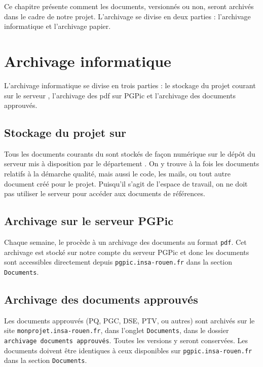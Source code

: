 
Ce chapitre présente comment les documents, versionnés ou non, seront archivés dans le cadre de notre projet. L’archivage se divise en deux parties : l’archivage informatique et l’archivage papier.

\section{Archivage informatique}
L'archivage informatique se divise en trois parties : le stockage du projet courant sur le serveur \git{}, l'archivage des pdf sur PGPic et l'archivage des documents approuvés.

\subsection{Stockage du projet sur \git{}}
Tous les documents courants du \PICCourt sont stockés de façon numérique sur le dépôt du serveur \git{} mis à disposition par le département \ASI{}. On y trouve à la fois les documents relatifs à la démarche qualité, mais aussi le code, les mails, ou tout autre document créé pour le projet. Puisqu'il s'agit de l'espace de travail, on ne doit pas utiliser le serveur \git{} pour accéder aux documents de références.

\subsection{Archivage sur le serveur PGPic}

Chaque semaine, le \RQ{} procède à un archivage des documents au format \verb+pdf+. Cet archivage est stocké sur notre compte du serveur PGPic et donc les documents sont accessibles directement depuis \verb+pgpic.insa-rouen.fr+ dans la section \verb+Documents+.

\subsection{Archivage des documents approuvés}

Les documents approuvés (PQ, PGC, DSE, PTV, ou autres) sont archivés sur le site \verb+monprojet.insa-rouen.fr+, dans l'onglet \verb+Documents+, dans le dossier \verb+archivage documents approuvés+. Toutes les versions y seront conservées. Les documents doivent être identiques à ceux disponibles sur \verb+pgpic.insa-rouen.fr+ dans la section \verb+Documents+.

